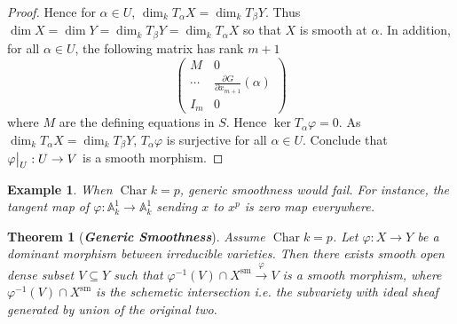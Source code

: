 \documentclass{ctexart}
\newtheorem{theorem}{Theorem}[section]
\newtheorem{example}{Example}[section]
\newcommand{\characteristic}{\operatorname{Char}}
\newcommand{\smooth}{\operatorname{sm}}
\begin{document}
\begin{proof}
    \par
    Hence for $\alpha\in U$, $\dim_{k} T_{\alpha}X = \dim_{k} T_{\beta}Y$. 
    Thus $\dim X = \dim Y = \dim_{k} T_{\beta}Y = \dim_{k} T_{\alpha}X$ so that $X$ is smooth at $\alpha$.
    In addition, for all $\alpha\in U$, the following matrix has rank $m + 1$
    \begin{equation}
        \begin{pmatrix}
            M & 0 \\
            \cdots & \frac{\partial G}{\partial x_{m + 1}}(\alpha) \\
            I_{m} & 0
        \end{pmatrix}
    \end{equation}
    where $M$ are the defining equations in $S$.
    Hence $\ker T_{\alpha}\varphi = 0$.
    As $\dim_{k} T_{\alpha}X = \dim_{k} T_{\beta}Y$, $T_{\alpha}\varphi$ is surjective for all $\alpha\in U$.
    Conclude that $\varphi\big{|}_{U}: U \rightarrow V$ is a smooth morphism.
\end{proof}
\begin{example}
    When $\characteristic k = p$, generic smoothness would fail.
    For instance, the tangent map of $\varphi: \mathbb{A}_{k}^{1} \rightarrow \mathbb{A}_{k}^{1}$ sending $x$ to $x^{p}$ is zero map everywhere.
\end{example}
\begin{theorem}[\textbf{\emph{Generic Smoothness}}]
    Assume $\characteristic k = p$.
    Let $\varphi: X \rightarrow Y$ be a dominant morphism between irreducible varieties.
    Then there exists smooth open dense subset $V \subseteq Y$ such that $\varphi^{-1}(V) \cap X^{\smooth} \overset{\varphi}{\rightarrow} V$ is a smooth morphism,
    where $\varphi^{-1}(V) \cap X^{\smooth}$ is the schemetic intersection i.e. the subvariety with ideal sheaf generated by union of the original two.
    \label{Theorem 5.4}
\end{theorem}
\end{document}
